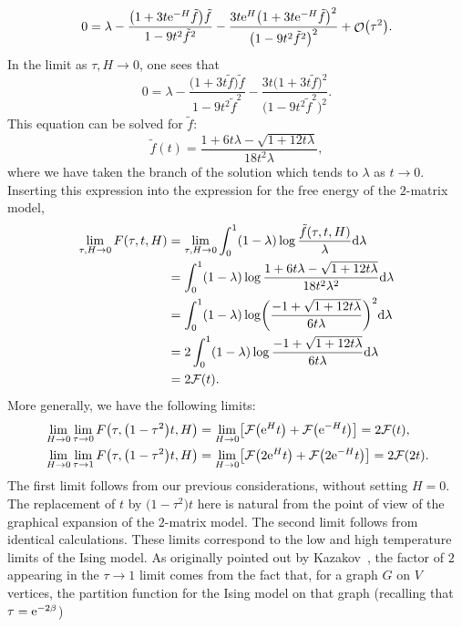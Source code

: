 \documentclass[pdftex]{sigma}
\DeclareMathOperator{\OO}{\mathcal{O}}
\numberwithin{equation}{section}
\begin{document}
\begin{Remark}
 \begin{equation*}
 0 = \lambda - \frac{\bigl(1+3t{\rm e}^{-H}\tilde{f}\bigr)\tilde{f}}{1-9t^2\tilde{f}^2} - \frac{3t{\rm e}^H\bigl(1+3t{\rm e}^{-H}\tilde{f}\bigr)^2}{\bigl(1-9t^2\tilde{f}^2\bigr)^2} + \OO\bigl(\tau^2\bigr).
 \end{equation*}
 In the limit as $\tau,H\to 0$, one sees that
 \begin{equation*}
 0 = \lambda - \frac{\bigl(1+3t\tilde{f}\bigr)\tilde{f}}{1-9t^2\tilde{f}^2} - \frac{3t\bigl(1+3t\tilde{f}\bigr)^2}{\bigl(1-9t^2\tilde{f}^2\bigr)^2}.
 \end{equation*}
 This equation can be solved for $\tilde{f}$:
 \begin{equation*}
 \tilde{f}(t) = \frac{1 + 6t\lambda -\sqrt{1 + 12t\lambda}}{18t^2\lambda},
 \end{equation*}
 where we have taken the branch of the solution which tends to $\lambda$ as $t\to 0$.
 Inserting this expression into the expression for the free energy of the $2$-matrix model,
 \begin{align*}
 \lim_{\tau,H\to 0} F(\tau,t,H) &= \lim_{\tau,H\to 0} \int_{0}^{1}(1-\lambda) \log\frac{\tilde{f}(\tau,t,H)}{\lambda} {\rm d}\lambda\\
 &= \int_{0}^{1}(1-\lambda) \log\frac{1 + 6t\lambda -\sqrt{1 + 12t\lambda}}{18t^2\lambda^2} {\rm d}\lambda\\
 &= \int_{0}^{1}(1-\lambda) \log\biggl(\frac{-1 + \sqrt{1+12t\lambda}}{6t\lambda}\biggr)^2 {\rm d}\lambda\\
 &=2\int_{0}^{1}(1-\lambda) \log\frac{-1 + \sqrt{1+12t\lambda}}{6t\lambda} {\rm d}\lambda\\
 &=2\mathcal{F}(t).
 \end{align*}
 More generally, we have the following limits:
 \begin{align*}
 &\lim_{H\to 0}\lim_{\tau\to 0} F\bigl(\tau,\bigl(1-\tau^2\bigr)t,H\bigr)= \lim_{H\to 0}\bigl[\mathcal{F}\bigl({\rm e}^{H}t\bigr) + \mathcal{F}\bigl({\rm e}^{-H}t\bigr)\bigr] = 2\mathcal{F}(t),\\
 &\lim_{H\to 0}\lim_{\tau\to 1} F\bigl(\tau,\bigl(1-\tau^2\bigr)t,H\bigr)= \lim_{H\to 0}\bigl[\mathcal{F}\bigl(2{\rm e}^{H}t\bigr) + \mathcal{F}\bigl(2{\rm e}^{-H}t\bigr)\bigr] = 2\mathcal{F}(2t).
 \end{align*}
 The first limit follows from our previous considerations, without setting $H=0$. The replacement of $t$ by $\bigl(1-\tau^2\bigr)t$ here is natural from the point
 of view of the graphical expansion of the $2$-matrix model. The second limit follows from identical calculations. These limits correspond to the low and high temperature limits of the Ising model. As originally pointed out by Kazakov~\cite{Kazakov1}, the factor of $2$ appearing in the $\tau\to 1$ limit comes from the fact that, for a graph $G$ on $V$ vertices, the partition function for the Ising model on that graph \big(recalling that $\tau = {\rm e}^{-2\beta}$\big)

\end{Remark}
\end{document}
